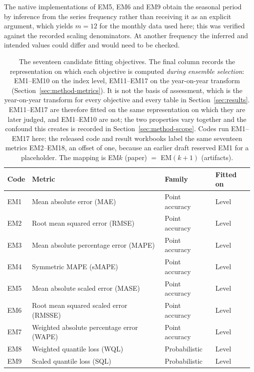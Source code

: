 \documentclass[12pt]{article}
\begin{document}
The native implementations of EM5, EM6 and EM9 obtain the seasonal period by
inference from the series frequency rather than receiving it as an explicit
argument, which yields $m = 12$ for the monthly data used here; this was
verified against the recorded scaling denominators. At another frequency the
inferred and intended values could differ and would need to be checked.

\begin{table}[htbp]
\centering
\caption{The seventeen candidate fitting objectives. The final column records
the representation on which each objective is computed \emph{during ensemble
selection}: EM1--EM10 on the index level, EM11--EM17 on the year-on-year
transform (Section~\ref{sec:method-metrics}). It is not the basis of
assessment, which is the year-on-year transform for every objective and every
table in Section~\ref{sec:results}. EM11--EM17 are therefore fitted on the same
representation on which they are later judged, and EM1--EM10 are not; the two
properties vary together and the confound this creates is recorded in
Section~\ref{sec:method-scope}. Codes run EM1--EM17 here; the released code and
result workbooks label the same seventeen metrics EM2--EM18, an offset of one,
because an earlier draft reserved EM1 for a placeholder. The mapping is EM$k$
(paper) $=$ EM$(k{+}1)$ (artifacts).}
\label{tab:metrics}
\begin{tabular}{llll}
\toprule
Code & Metric & Family & Fitted on \\
\midrule
EM1  & Mean absolute error (MAE)                 & Point accuracy      & Level \\
EM2  & Root mean squared error (RMSE)            & Point accuracy      & Level \\
EM3  & Mean absolute percentage error (MAPE)     & Point accuracy      & Level \\
EM4  & Symmetric MAPE (sMAPE)                    & Point accuracy      & Level \\
EM5  & Mean absolute scaled error (MASE)         & Point accuracy      & Level \\
EM6  & Root mean squared scaled error (RMSSE)    & Point accuracy      & Level \\
EM7  & Weighted absolute percentage error (WAPE) & Point accuracy      & Level \\
EM8  & Weighted quantile loss (WQL)              & Probabilistic       & Level \\
EM9 & Scaled quantile loss (SQL)                & Probabilistic       & Level \\

\end{tabular}
\end{table}
\end{document}
